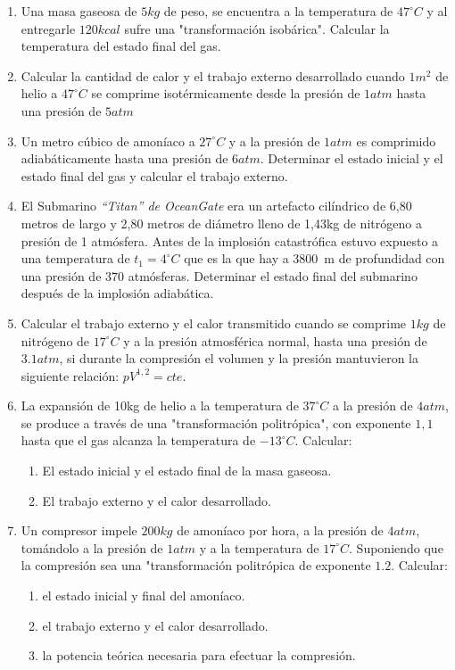 \documentclass[../main]{subfiles}
\begin{document}
\begin{enumerate}
  \item Una masa gaseosa de $5kg$ de peso, se encuentra a la
    temperatura de $47^\circ C$ y al entregarle $120kcal$ sufre una
    "transformación isobárica". Calcular la temperatura del estado
    final del gas.
  \item Calcular la cantidad de calor y el trabajo externo
    desarrollado cuando $1m^2$ de helio a $47^\circ C$ se comprime
    isotérmicamente desde la presión de $1 atm$ hasta una presión de $ 5 atm$
  \item Un metro cúbico de amoníaco a $27^\circ C $ y a la presión de
    $1atm$ es comprimido adiabáticamente hasta una presión de $6atm$.
    Determinar el estado inicial y el estado final del gas y calcular
    el trabajo externo.
  \item El Submarino \emph{“Titan” de OceanGate} era un artefacto
    cilíndrico de 6,80 metros de largo y 2,80 metros de diámetro
    lleno de 1,43kg de nitrógeno a presión de 1 atmósfera. Antes de
    la implosión catastrófica estuvo expuesto a una temperatura de
    $t_1=4^\circ C$ que es la que hay a \SI{3800}{\m} de profundidad con
    una presión de 370 atmósferas. Determinar el estado final del
    submarino después de la implosión adiabática.
  \item Calcular el trabajo externo y el calor transmitido cuando se
    comprime $1kg$ de nitrógeno de $17^\circ C$ y a la presión
    atmosférica normal, hasta una presión de $3.1atm$, si durante la
    compresión el volumen y la presión mantuvieron la siguiente
    relación: $p V^{1,2}=cte$.
  \item La expansión de 10kg de helio a la temperatura de $37^\circ
    C$ a la presión de $4 atm$, se produce a través de una
    "transformación politrópica", con exponente $1,1$ hasta que el
    gas alcanza la temperatura de $-13^\circ C$. Calcular:
    \begin{enumerate}
      \item El estado inicial y el estado final de la masa gaseosa.
      \item El trabajo externo y el calor desarrollado.
    \end{enumerate}
  \item Un compresor impele $200kg$ de amoníaco por hora, a la
    presión de $4 atm$, tomándolo a la presión de $1 atm$ y a la
    temperatura de $17^\circ C$. Suponiendo que la compresión sea una
    "transformación politrópica de exponente $1.2$. Calcular:
    \begin{enumerate}
      \item el estado inicial y final del amoníaco.
      \item el trabajo externo y el calor desarrollado.
      \item la potencia teórica necesaria para efectuar la compresión.
    \end{enumerate}
\end{enumerate}
\end{document}
